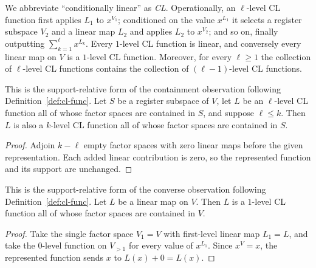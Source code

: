 We abbreviate ``conditionally linear'' as \emph{CL}. Operationally, an $\ell$-level CL function first applies $L_1$ to $x^{V_1}$; conditioned on the value $x^{L_1}$ it selects a register subspace $V_2$ and a linear map $L_2$ and applies $L_2$ to $x^{V_2}$; and so on, finally outputting $\sum_{k=1}^{\ell} x^{L_k}$. Every $1$-level CL function is linear, and conversely every linear map on $V$ is a $1$-level CL function. Moreover, for every $\ell \ge 1$ the collection of $\ell$-level CL functions contains the collection of $(\ell-1)$-level CL functions.

\begin{lemma}\label{lem:cl-level-mono}
	\leanok
	This is the support-relative form of the containment observation following Definition~\ref{def:cl-func}. Let $S$ be a register subspace of $V$, let $L$ be an $\ell$-level CL function all of whose factor spaces are contained in $S$, and suppose $\ell \le k$. Then $L$ is also a $k$-level CL function all of whose factor spaces are contained in $S$.
\end{lemma}
\begin{proof}
	\leanok
	Adjoin $k-\ell$ empty factor spaces with zero linear maps before the given representation. Each added linear contribution is zero, so the represented function and its support are unchanged.
\end{proof}

\begin{lemma}\label{lem:cl-one-level-linear}
	\leanok
	This is the support-relative form of the converse observation following Definition~\ref{def:cl-func}. Let $L$ be a linear map on $V$. Then $L$ is a $1$-level CL function all of whose factor spaces are contained in $V$.
\end{lemma}
\begin{proof}
	\leanok
	Take the single factor space $V_1 = V$ with first-level linear map $L_1 = L$, and take the $0$-level function on $V_{>1}$ for every value of $x^{L_1}$. Since $x^V = x$, the represented function sends $x$ to $L(x) + 0 = L(x)$.
\end{proof}

